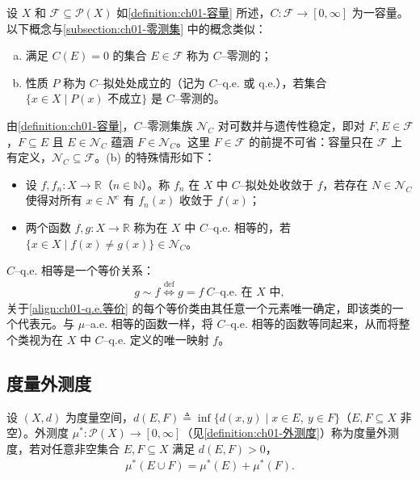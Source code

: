 \documentclass[../../main.tex]{subfiles}%
\begin{document}
设 $X$ 和 $\mathcal{F}\subseteq\mathcal{P}(X)$ 如\cref{definition:ch01-容量} 所述，$C:\mathcal{F}\to[0,\infty]$ 为一容量。以下概念与\cref{subsection:ch01-零测集} 中的概念类似：
\begin{enumerate}[(a)]
\item 满足 $C(E)=0$ 的集合 $E\in\mathcal{F}$ 称为 $C$--零测的；
\item 性质 $P$ 称为 $C$--拟处处成立的（记为 $C$--q.e. 或 q.e.），若集合 $\{x\in X\mid P(x)\text{ 不成立}\}$ 是 $C$--零测的。
\end{enumerate}

由\cref{definition:ch01-容量}，$C$--零测集族 $\mathcal{N}_C$ 对可数并与遗传性稳定，即对 $F,E\in\mathcal{F}$，$F\subseteq E$ 且 $E\in\mathcal{N}_C$ 蕴涵 $F\in\mathcal{N}_C$。这里 $F\in\mathcal{F}$ 的前提不可省：容量只在 $\mathcal{F}$ 上有定义，$\mathcal{N}_C\subseteq\mathcal{F}$。(b) 的特殊情形如下：
\begin{itemize}
\item 设 $f,f_n:X\to\mathbb{R}$（$n\in\mathbb{N}$）。称 $f_n$ 在 $X$ 中 $C$--拟处处收敛于 $f$，若存在 $N\in\mathcal{N}_C$ 使得对所有 $x\in N^c$ 有 $f_n(x)$ 收敛于 $f(x)$；
\item 两个函数 $f,g:X\to\mathbb{R}$ 称为在 $X$ 中 $C$--q.e. 相等的，若 $\{x\in X\mid f(x)\neq g(x)\}\in\mathcal{N}_C$。
\end{itemize}

$C$--q.e. 相等是一个等价关系：
\begin{align}
g\sim f\overset{\mathrm{def}}{\Longleftrightarrow}g=f\ C\text{--q.e. 在 }X\text{ 中}, \label{align:ch01-q.e.等价}
\end{align}
关于\eqref{align:ch01-q.e.等价} 的每个等价类由其任意一个元素唯一确定，即该类的一个代表元。与 $\mu$--a.e. 相等的函数一样，将 $C$--q.e. 相等的函数等同起来，从而将整个类视为在 $X$ 中 $C$--q.e. 定义的唯一映射 $f$。

\subsection{度量外测度}\label{subsection:ch01-度量外测度}

\begin{definition}[度量外测度]\label{definition:ch01-度量外测度}
设 $(X,d)$ 为度量空间，$d(E,F)\triangleq\inf\{d(x,y)\mid x\in E,\ y\in F\}$（$E,F\subseteq X$ 非空）。外测度 $\mu^*:\mathcal{P}(X)\to[0,\infty]$（见\cref{definition:ch01-外测度}）称为度量外测度，若对任意非空集合 $E,F\subseteq X$ 满足 $d(E,F)>0$，
\begin{align}
\mu^*(E\cup F)=\mu^*(E)+\mu^*(F). \label{align:ch01-度量外测度条件}
\end{align}
\end{definition}
\end{document}
